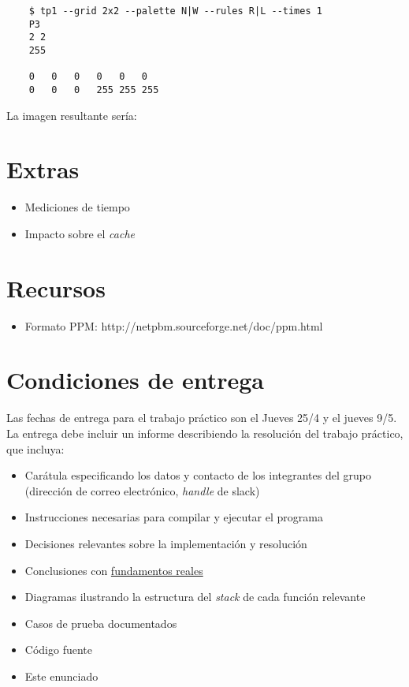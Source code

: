 \documentclass{article}
\begin{document}
    \begin{verbatim}
    $ tp1 --grid 2x2 --palette N|W --rules R|L --times 1
    P3
    2 2
    255

    0   0   0   0   0   0 
    0   0   0   255 255 255
    \end{verbatim}

La imagen resultante sería:
\begin{center}
\end{center}

\section{Extras}
\begin{itemize}
\item Mediciones de tiempo
\item Impacto sobre el \textit{cache}
\end{itemize}

\section{Recursos}\label{Recursos}

\begin{itemize}
\item Formato PPM: http://netpbm.sourceforge.net/doc/ppm.html
\end{itemize}

\section{Condiciones de entrega}

Las fechas de entrega para el trabajo práctico son el Jueves 25/4 y el jueves 9/5. La entrega debe incluir un informe
describiendo la resolución del trabajo práctico, que incluya:

\begin{itemize}
\item Carátula especificando los datos y contacto de los integrantes del grupo (dirección de correo electrónico, \textit{handle} de slack)
\item Instrucciones necesarias para compilar y ejecutar el programa
\item Decisiones relevantes sobre la implementación y resolución
\item Conclusiones con \underline{fundamentos reales}
\item Diagramas ilustrando la estructura del \textit{stack} de cada función relevante
\item Casos de prueba documentados
\item Código fuente
\item Este enunciado
\end{itemize}
\end{document}
